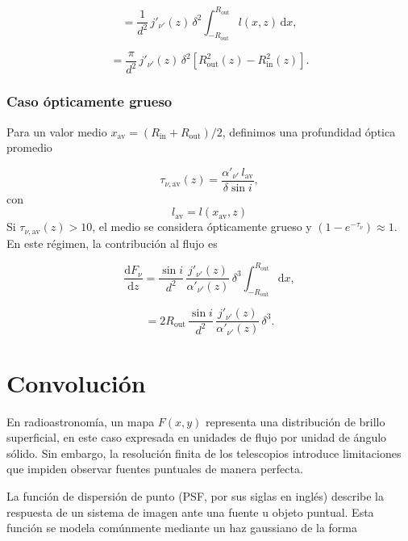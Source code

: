 \begin{equation}\label{eq:mod-42}
    = \frac{1}{d^2}\, j'_{\nu'}(z)\, \delta^2
      \int_{-R_\mathrm{out}}^{R_\mathrm{out}} l(x, z)\, \mathrm{d}x,
\end{equation}

\begin{equation*}
    = \frac{\pi}{d^2}\, j'_{\nu'}(z)\, \delta^2
      \left[R_\mathrm{out}^2(z) - R_\mathrm{in}^2(z)\right].
\end{equation*}

\subsubsection*{Caso ópticamente grueso}

	Para un valor medio $x_\mathrm{av} = (R_\mathrm{in} + R_\mathrm{out})/2$, definimos una profundidad óptica promedio

\[
\tau_{\nu,\mathrm{av}}(z) = \frac{\alpha'_{\nu'}\, l_\mathrm{av}}{\delta \sin i},
\]
con
\[
l_\mathrm{av}=l(x_\mathrm{av},z)
\]
	Si $\tau_{{\nu},\mathrm{av}}(z) > 10$, el medio se considera ópticamente grueso y $(1 - e^{-\tau_\nu}) \approx 1$.
	En este régimen, la contribución al flujo es

\begin{equation}\label{eq:mod-43}
    \frac{\mathrm{d}F_\nu}{\mathrm{d}z}
    = \frac{\sin i}{d^2}\,
      \frac{j'_{\nu'}(z)}{\alpha'_{\nu'}(z)}\, \delta^3
      \int_{-R_\mathrm{out}}^{R_\mathrm{out}} \mathrm{d}x,
\end{equation}

\begin{equation*}
    = 2R_\mathrm{out}\,
      \frac{\sin i}{d^2}\,
      \frac{j'_{\nu'}(z)}{\alpha'_{\nu'}(z)}\, \delta^3.
\end{equation*}

\section{Convoluci\'on}\label{Sec:Convolucion}

	En radioastronomía, un mapa $F(x,y)$ representa una distribución de brillo superficial, en este caso expresada en unidades de flujo por unidad de ángulo sólido.
	Sin embargo, la resolución finita de los telescopios introduce limitaciones que impiden observar fuentes puntuales de manera perfecta.

	La función de dispersión de punto (PSF, por sus siglas en inglés) describe la respuesta de un sistema de imagen ante una fuente u objeto puntual.
	Esta función se modela comúnmente mediante un haz gaussiano de la forma

